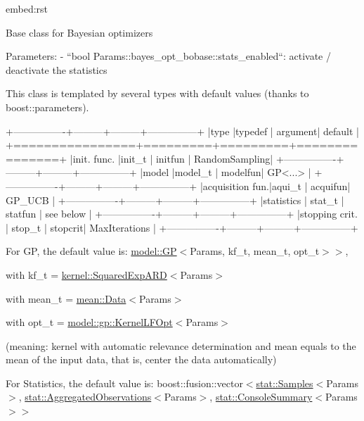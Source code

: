 \begin{DoxyVerb}embed:rst

Base class for Bayesian optimizers

Parameters:
  - ``bool Params::bayes_opt_bobase::stats_enabled``: activate / deactivate the statistics

This class is templated by several types with default values (thanks to boost::parameters).

+----------------+---------+---------+---------------+
|type            |typedef  | argument| default       |
+================+=========+=========+===============+
|init. func.     |init_t   | initfun | RandomSampling|
+----------------+---------+---------+---------------+
|model           |model_t  | modelfun| GP<...>       |
+----------------+---------+---------+---------------+
|acquisition fun.|aqui_t   | acquifun| GP_UCB        |
+----------------+---------+---------+---------------+
|statistics      | stat_t  | statfun | see below     |
+----------------+---------+---------+---------------+
|stopping crit.  | stop_t  | stopcrit| MaxIterations |
+----------------+---------+---------+---------------+\end{DoxyVerb}


For GP, the default value is\+: {\ttfamily \hyperlink{classlimbo_1_1model_1_1_g_p}{model\+::\+GP}$<$Params, kf\+\_\+t, mean\+\_\+t, opt\+\_\+t$>$$>$},
\begin{DoxyItemize}
\item with {\ttfamily kf\+\_\+t = \hyperlink{structlimbo_1_1kernel_1_1_squared_exp_a_r_d}{kernel\+::\+Squared\+Exp\+A\+RD}$<$Params$>$}
\item with {\ttfamily mean\+\_\+t = \hyperlink{structlimbo_1_1mean_1_1_data}{mean\+::\+Data}$<$Params$>$}
\item with {\ttfamily opt\+\_\+t = \hyperlink{structlimbo_1_1model_1_1gp_1_1_kernel_l_f_opt}{model\+::gp\+::\+Kernel\+L\+F\+Opt}$<$Params$>$}
\end{DoxyItemize}

(meaning\+: kernel with automatic relevance determination and mean equals to the mean of the input data, that is, center the data automatically)

For Statistics, the default value is\+: {\ttfamily boost\+::fusion\+::vector$<$\hyperlink{structlimbo_1_1stat_1_1_samples}{stat\+::\+Samples}$<$Params$>$, \hyperlink{structlimbo_1_1stat_1_1_aggregated_observations}{stat\+::\+Aggregated\+Observations}$<$Params$>$, \hyperlink{structlimbo_1_1stat_1_1_console_summary}{stat\+::\+Console\+Summary}$<$Params$>$$>$}

